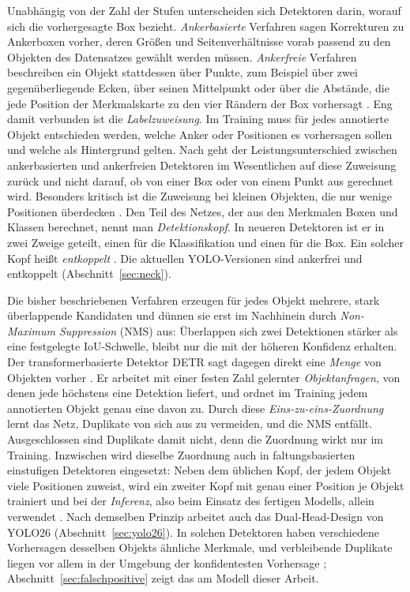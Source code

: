  Unabhängig von der Zahl der Stufen
unterscheiden sich Detektoren darin, worauf sich die vorhergesagte Box bezieht.
\emph{Ankerbasierte} Verfahren sagen Korrekturen zu Ankerboxen vorher, deren
Größen und Seitenverhältnisse vorab passend zu den Objekten des Datensatzes
gewählt werden müssen. \emph{Ankerfreie} Verfahren beschreiben ein Objekt
stattdessen über Punkte, zum Beispiel über zwei gegenüberliegende Ecken, über
seinen Mittelpunkt oder über die Abstände, die jede Position der Merkmalskarte
zu den vier Rändern der Box vorhersagt
\parencite{law2018cornernet,zhou2019centernet,tian2019fcos}. Eng damit
verbunden ist die \emph{Labelzuweisung}. Im Training muss für jedes annotierte
Objekt entschieden werden, welche Anker oder Positionen es vorhersagen sollen
und welche als Hintergrund gelten. Nach \textcite{zhang2020atss} geht der
Leistungsunterschied zwischen ankerbasierten und ankerfreien Detektoren im
Wesentlichen auf diese Zuweisung zurück und nicht darauf, ob von einer Box oder
von einem Punkt aus gerechnet wird. Besonders kritisch ist die Zuweisung bei
kleinen Objekten, die nur wenige Positionen überdecken \parencite{xu2022rfla}.
Den Teil des Netzes, der aus den Merkmalen Boxen und Klassen berechnet, nennt
man \emph{Detektionskopf}. In neueren Detektoren ist er in zwei Zweige geteilt,
einen für die Klassifikation und einen für die Box. Ein solcher Kopf heißt
\emph{entkoppelt} \parencite{ge2021yolox}. Die aktuellen YOLO-Versionen sind
ankerfrei und entkoppelt (Abschnitt~\ref{sec:neck}).

 Die bisher beschriebenen Verfahren
erzeugen für jedes Objekt mehrere, stark überlappende Kandidaten und dünnen sie
erst im Nachhinein durch \emph{Non-Maximum Suppression} (NMS) aus: Überlappen
sich zwei Detektionen stärker als eine festgelegte IoU-Schwelle, bleibt nur die
mit der höheren Konfidenz erhalten. Der transformerbasierte Detektor DETR sagt
dagegen direkt eine \emph{Menge} von Objekten vorher \parencite{carion2020detr}.
Er arbeitet mit einer festen Zahl gelernter \emph{Objektanfragen}, von denen
jede höchstens eine Detektion liefert, und ordnet im Training jedem annotierten
Objekt genau eine davon zu. Durch diese \emph{Eins-zu-eins-Zuordnung} lernt das
Netz, Duplikate von sich aus zu vermeiden, und die NMS entfällt. Ausgeschlossen
sind Duplikate damit nicht, denn die Zuordnung wirkt nur im Training. Inzwischen
wird dieselbe Zuordnung auch in faltungsbasierten einstufigen Detektoren
eingesetzt: Neben dem üblichen Kopf, der jedem Objekt viele Positionen zuweist,
wird ein zweiter Kopf mit genau einer Position je Objekt trainiert und bei der
\emph{Inferenz}, also beim Einsatz des fertigen Modells, allein verwendet
\parencite{wang2024yolov10}. Nach demselben Prinzip arbeitet auch das
Dual-Head-Design von YOLO26 (Abschnitt~\ref{sec:yolo26}). In solchen Detektoren
haben verschiedene Vorhersagen desselben Objekts ähnliche Merkmale, und
verbleibende Duplikate liegen vor allem in der Umgebung der konfidentesten
Vorhersage \parencite{wang2021defcn}; Abschnitt~\ref{sec:falschpositive} zeigt
das am Modell dieser Arbeit.

